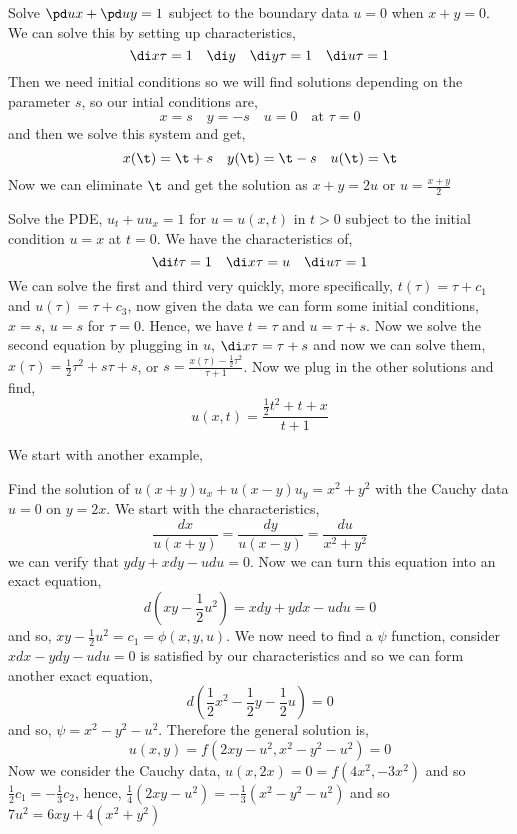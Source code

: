 \begin{eg}
  Solve $\pd u x + \pd u y = 1$ subject to the boundary data $u = 0$ when $x + y = 0$. We can solve this by setting up characteristics,
  $$ \di x \tau = 1 \quad \di y \quad \di y \tau = 1 \quad \di u \tau = 1 $$
  Then we need initial conditions so we will find solutions depending on the parameter $s$, so our intial conditions are,
  $$ x = s \quad y = -s \quad u = 0 \quad \text{at $\tau = 0$} $$
  and then we solve this system and get,
  $$ x(\t) = \t + s \quad y(\t) = \t - s \quad u(\t) = \t $$
  Now we can eliminate $\t$ and get the solution as $x + y = 2u$ or $u = \frac{x + y}{2}$
\end{eg}
\begin{eg}
  Solve the PDE, $u_t + uu_x = 1$ for $u = u(x, t)$ in $t > 0$ subject to the initial condition $u = x$ at $t = 0$. We have the characteristics of,
  $$ \di t \tau = 1 \quad \di x \tau = u \quad \di u \tau = 1 $$
  We can solve the first and third very quickly, more specifically, $t(\tau) = \tau + c_1$ and $u(\tau) = \tau + c_3$, now given the data we can form some initial conditions, $x = s$, $u = s$ for $\tau = 0$. Hence, we have $t = \tau$ and $u = \tau + s$. Now we solve the second equation by plugging in $u$, $\di x \tau = \tau + s$ and now we can solve them, $x(\tau) = \frac{1}{2}\tau^2 + s\tau + s$, or $s = \frac{x(\tau) - \frac{1}{2}\tau^2}{\tau + 1}$.
  Now we plug in the other solutions and find,
  $$ u(x, t) = \frac{\frac{1}{2}t^2 + t + x}{t + 1} $$
\end{eg}

We start with another example,
\begin{eg}
  Find the solution of $u(x + y)u_x + u(x - y)u_y = x^2 + y^2$ with the Cauchy data $u = 0$ on $y = 2x$. We start with the characteristics,
  $$ \frac{dx}{u(x + y)} = \frac{dy}{u(x - y)} = \frac{du}{x^2 + y^2} $$ we can verify that $ydy + xdy - udu = 0$. Now we can turn this equation into an exact equation,
  $$ d\left(xy - \frac{1}{2}u^2\right) = xdy + ydx - udu = 0 $$
  and so, $xy - \frac{1}{2}u^2 = c_1 = \phi(x, y, u)$. We now need to find a $\psi$ function, consider $xdx - ydy - udu = 0$ is satisfied by our characteristics and so we can form another exact equation,
  $$ d\left( \frac{1}{2}x^2 - \frac{1}{2}y - \frac{1}{2}u\right) = 0 $$
  and so, $\psi = x^2 - y^2 - u^2$. Therefore the general solution is,
  $$ u(x, y) = f\left(2xy - u^2, x^2 - y^2 - u^2\right) = 0 $$
  Now we consider the Cauchy data, $u(x, 2x) = 0 = f(4x^2, -3x^2)$ and so $\frac{1}{2}c_1 = -\frac{1}{3}c_2$, hence, $\frac{1}{4}\left( 2xy - u^2 \right) = -\frac{1}{3}\left(x^2- y^2 - u^2\right)$ and so $7u^2 = 6xy + 4(x^2 + y^2)$
\end{eg}

